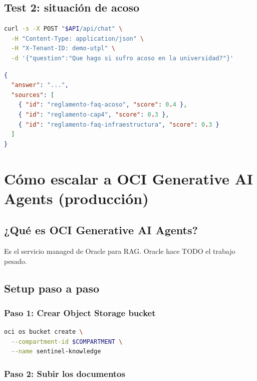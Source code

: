 \documentclass[11pt,a4paper,oneside]{article}
\begin{document}
\subsection{Test 2: situaci\'on de acoso}

\begin{lstlisting}[language=bash,caption={Pregunta sobre acoso}]
curl -s -X POST "$API/api/chat" \
  -H "Content-Type: application/json" \
  -H "X-Tenant-ID: demo-utpl" \
  -d '{"question":"Que hago si sufro acoso en la universidad?"}'
\end{lstlisting}

\begin{lstlisting}[language=json,caption={Output esperado}]
{
  "answer": "...",
  "sources": [
    { "id": "reglamento-faq-acoso", "score": 0.4 },
    { "id": "reglamento-cap4", "score": 0.3 },
    { "id": "reglamento-faq-infraestructura", "score": 0.3 }
  ]
}
\end{lstlisting}

\section{C\'omo escalar a OCI Generative AI Agents (producci\'on)}

\subsection{¿Qu\'e es OCI Generative AI Agents?}

Es el servicio managed de Oracle para RAG. Oracle hace TODO el trabajo pesado.

\subsection{Setup paso a paso}

\subsubsection{Paso 1: Crear Object Storage bucket}

\begin{lstlisting}[language=bash,caption={Ya lo hicimos}]
oci os bucket create \
  --compartment-id $COMPARTMENT \
  --name sentinel-knowledge
\end{lstlisting}

\subsubsection{Paso 2: Subir los documentos}
\end{document}

